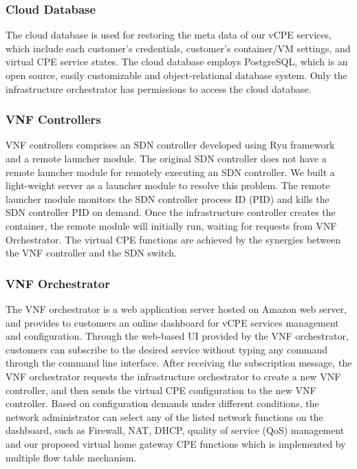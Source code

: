 \subsubsection{Cloud Database}
The cloud database is used for restoring the meta data of our vCPE services, which include each customer’s credentials, customer’s container/VM settings, and virtual CPE service states. The cloud database employs PostgreSQL, which is an open source, easily customizable and object-relational database system. Only the infrastructure orchestrator has permissions to access the cloud database.

\subsubsection{VNF Controllers}
VNF controllers comprises an SDN controller developed using Ryu framework \cite{ryu} and a remote launcher module. The original SDN controller does not have a remote launcher module for remotely executing an SDN controller. We built a light-weight server as a launcher module to resolve this problem. The remote launcher module monitors the SDN controller process ID (PID) and kills the SDN controller PID on demand. Once the infrastructure controller  creates the container, the remote module will initially run, waiting for requests from VNF Orchestrator. The virtual CPE functions are achieved by the synergies between the VNF controller and the SDN switch.

\subsubsection{VNF Orchestrator}
The VNF orchestrator is a web application server hosted on Amazon web server, and provides to customers an online dashboard for vCPE services management and configuration. Through the web-based UI provided by the VNF orchestrator, customers can subscribe to the desired service without typing any command through the command line interface. After receiving the subscription message, the VNF orchestrator requests the infrastructure orchestrator to create a new VNF controller, and then sends the virtual CPE configuration to the new VNF controller. Based on configuration demands under different conditions, the network administrator can select any of the listed network functions on the dashboard, such as Firewall, NAT, DHCP, quality of service (QoS) management and our proposed virtual home gateway CPE functions which is implemented by multiple flow table mechanism.
